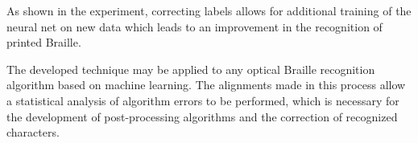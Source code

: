 \documentclass{main.tex}[subfiles]
\begin{document}
As shown in the experiment, correcting labels allows for additional training of the neural net on new data which leads to an improvement in the recognition of printed Braille.

The developed technique may be applied to any optical Braille recognition algorithm based on machine learning.
The alignments made in this process allow a statistical analysis of algorithm errors to be performed, which is necessary for the development of post-processing algorithms and the correction of recognized characters.

\newpage
\end{document}
